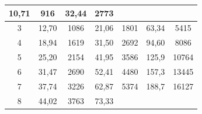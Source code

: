 \begin{table}[htbp]
\begin{tabular}{c|c|c|c|c|c|c}
10,71& 

916& 

32,44& 

2773 \\

\hline

3& 

12,70& 

1086& 

21,06& 

1801& 

63,34& 

5415 \\

\hline

4& 

18,94& 

1619& 

31,50& 

2692& 

94,60& 

8086 \\

\hline

5& 

25,20& 

2154& 

41,95& 

3586& 

125,9& 

10764 \\

\hline

6& 

31,47& 

2690& 

52,41& 

4480& 

157,3& 

13445 \\

\hline

7& 

37,74& 

3226& 

62,87& 

5374& 

188,7& 

16127 \\

\hline

8& 

44,02& 

3763& 

73,33& 


\end{tabular}
\end{table}
